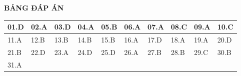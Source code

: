 \loigiai
{
	\begin{center}
		\textbf{BẢNG ĐÁP ÁN}
	\end{center}
	\begin{center}
		\begin{tabular}{|m{2.8em}|m{2.8em}|m{2.8em}|m{2.8em}|m{2.8em}|m{2.8em}|m{2.8em}|m{2.8em}|m{2.8em}|m{2.8em}|}
			\hline
			01.D  & 02.A  & 03.D  & 04.A  & 05.B  & 06.A  & 07.A & 08.C & 09.A & 10.C \\
			\hline
			11.A  & 12.B  & 13.B  & 14.B  & 15.B  & 16.A  & 17.D & 18.A & 19.A & 20.D \\
			\hline
			21.B  & 22.D  & 23.A  & 24.D  & 25.D  & 26.A  & 27.B & 28.B & 29.C & 30.B \\
			\hline
			31.A  &  &  &  &  &  & & &  & \\
			\hline
			
		\end{tabular}
	\end{center}
}

